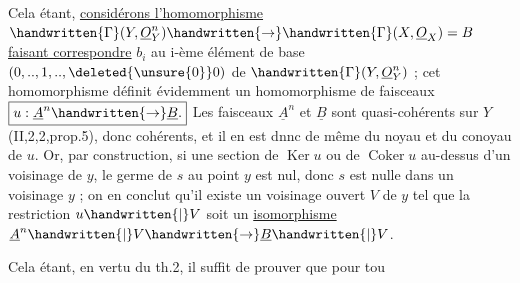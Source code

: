 Cela étant, \uline{considérons l'homomorphisme} $\handwritten{\Gamma}(Y,\underline O_Y^n)\handwritten{\to}\handwritten{\Gamma}(X,\underline O_X)=B$ \uline{faisant correspondre}
$b_i$ au i-ème élément de base $(0,..,1,..,\deleted{\unsure{0}}0)$ de $\handwritten{\Gamma}(Y,\underline O_Y^n)$ ; cet homomorphisme définit évidemment un homomorphisme de faisceaux $\boxed{u:\underline A^n\handwritten{\to}\underline B.}$  Les faisceaux $\underline A^n$ et $\underline B$ sont quasi-cohérents sur $Y$ (II,2,2,prop.5), donc cohérents, et il en est dnnc de même du noyau et du conoyau de $u$. Or, par construction, si  une section de $\operatorname{Ker}u$ ou de $\operatorname{Coker}u$ au-dessus d'un voisinage de $y$, le germe de $s$ au point $y$ est nul, donc $s$ est nulle dans un voisinage  $y$ ; on en conclut qu'il existe un voisinage ouvert $V$ de $y$ tel que la restriction $u\handwritten{\vert}V$ soit un \uline{isomorphisme} $\underline A^n\handwritten{\vert}V\handwritten{\to}\underline B\handwritten{\vert}V$.

Cela étant, en vertu du th.2, il suffit de prouver que pour tou
